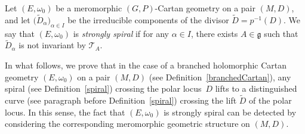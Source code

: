 \documentclass[pdftex]{sigma}
\numberwithin{equation}{section}
\begin{document}
 \begin{Definition}\label{strongtaucondition} Let $(E,\omega_0)$ be a meromorphic $(G,P)$-Cartan geometry on a pair $(M,D)$, and let $\big(\tilde{D}_\alpha\big)_{\alpha\in I}$ be the irreducible components of the divisor $\tilde{D}=p^{-1}(D)$. We say that $(E,\omega_0)$ is \textit{strongly spiral} if for any $\alpha \in I$, there exists $A\in \mathfrak{g}$ such that $\tilde{D}_\alpha$ is not invariant by $\mathcal{T}_A$.
 \end{Definition}

In what follows, we prove that in the case of a branched holomorphic Cartan geometry $(E,\omega_0)$ on a pair $(M,D)$ (see Definition~\ref{branchedCartan}), any spiral (see Definition~\ref{spiral}) crossing the polar locus~$D$ lifts to a distinguished curve (see paragraph before Definition~\ref{spiral}) crossing the lift $\tilde{D}$ of the polar locus. In this sense, the fact that $(E,\omega_0)$ is strongly spiral can be detected by considering the corresponding meromorphic geometric structure on $(M,D)$.
\end{document}
